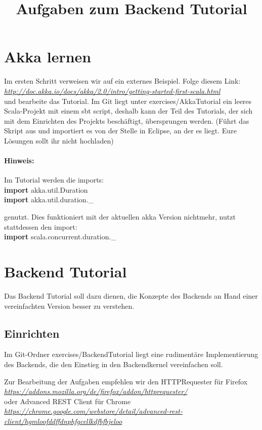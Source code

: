\documentclass[11pt]{tudexercise}
\title{Aufgaben zum Backend Tutorial}
\newcommand{\myimport}{\textbf{import} }
\newcommand{\link}[1]{\\ \textcolor{blue}{\textit{\url{#1}}}}
\begin{document}
  \maketitle

\section{Akka lernen}
  Im ersten Schritt verweisen wir auf ein externes Beispiel.
  Folge diesem Link:
  \link{http://doc.akka.io/docs/akka/2.0/intro/getting-started-first-scala.html}\\
  und bearbeite das Tutorial. Im Git liegt unter exercises/AkkaTutorial ein leeres Scala-Projekt
  mit einem sbt script, deshalb kann der Teil des Tutorials, der sich mit dem Einrichten des Projekts
  beschäftigt, übersprungen werden.
  (Führt das Skript aus und importiert es von der Stelle in Eclipse, an der es liegt.
  Eure Lösungen sollt ihr nicht hochladen)

  \paragraph*{Hinweis:}
  Im Tutorial werden die imports:\\
  \myimport akka.util.Duration\\
  \myimport akka.util.duration.\_
  
  genutzt. Dies funktioniert mit der aktuellen akka Version nichtmehr, nutzt stattdessen den import:\\
  \myimport scala.concurrent.duration.\_

\section{Backend Tutorial}
  Das Backend Tutorial soll dazu dienen, die Konzepte des Backends an Hand einer vereinfachten
  Version besser zu verstehen.

  \subsection{Einrichten}
  Im Git-Ordner exercises/BackendTutorial liegt eine rudimentäre Implementierung des Backends, 
  die den Einstieg in den Backendkernel vereinfachen soll.
 
  Zur Bearbeitung der Aufgaben empfehlen wir den HTTPRequester für Firefox
  \link{https://addons.mozilla.org/de/firefox/addon/httprequester/}\\
  oder Advanced REST Client für Chrome
  \link{https://chrome.google.com/webstore/detail/advanced-rest-client/hgmloofddffdnphfgcellkdfbfbjeloo}
\end{document}
